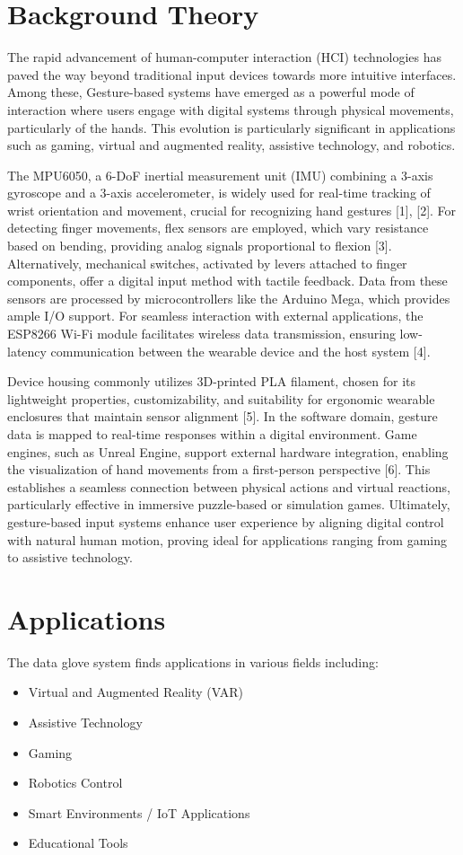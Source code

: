 \section{Background Theory}
The rapid advancement of human-computer interaction (HCI) technologies has paved the way beyond traditional input devices towards more intuitive interfaces. Among these, Gesture-based systems have emerged as a powerful mode of interaction where users engage with digital systems through physical movements, particularly of the hands. This evolution is particularly significant in applications such as gaming, virtual and augmented reality, assistive technology, and robotics.

The MPU6050, a 6-DoF inertial measurement unit (IMU) combining a 3-axis gyroscope and a 3-axis accelerometer, is widely used for real-time tracking of wrist orientation and movement, crucial for recognizing hand gestures [1], [2]. For detecting finger movements, flex sensors are employed, which vary resistance based on bending, providing analog signals proportional to flexion [3]. Alternatively, mechanical switches, activated by levers attached to finger components, offer a digital input method with tactile feedback. Data from these sensors are processed by microcontrollers like the Arduino Mega, which provides ample I/O support. For seamless interaction with external applications, the ESP8266 Wi-Fi module facilitates wireless data transmission, ensuring low-latency communication between the wearable device and the host system [4].

Device housing commonly utilizes 3D-printed PLA filament, chosen for its lightweight properties, customizability, and suitability for ergonomic wearable enclosures that maintain sensor alignment [5]. In the software domain, gesture data is mapped to real-time responses within a digital environment. Game engines, such as Unreal Engine, support external hardware integration, enabling the visualization of hand movements from a first-person perspective [6]. This establishes a seamless connection between physical actions and virtual reactions, particularly effective in immersive puzzle-based or simulation games. Ultimately, gesture-based input systems enhance user experience by aligning digital control with natural human motion, proving ideal for applications ranging from gaming to assistive technology.

\section{Applications}
The data glove system finds applications in various fields including:
\begin{itemize}
    \item Virtual and Augmented Reality (VAR)
    \item Assistive Technology
    \item Gaming
    \item Robotics Control
    \item Smart Environments / IoT Applications
    \item Educational Tools
\end{itemize}

